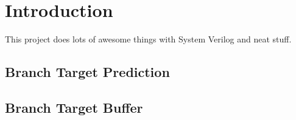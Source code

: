 \section{Introduction}
This project does lots of awesome things with System Verilog and neat stuff.

\subsection{Branch Target Prediction}
\subsection{Branch Target Buffer}
